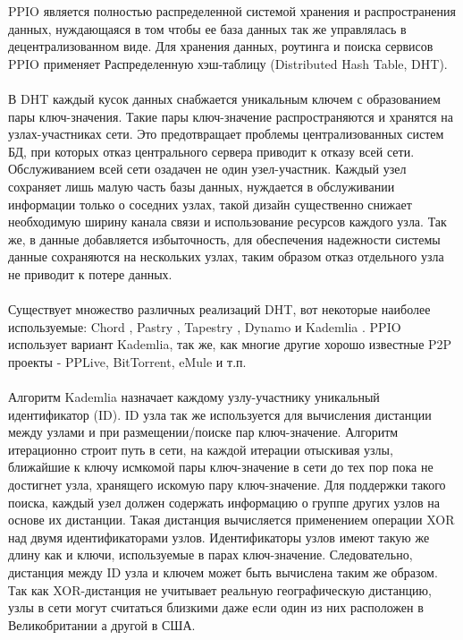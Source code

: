 \documentclass[10pt,a4paper]{article}
\begin{document}
PPIO является полностью распределенной системой хранения и распространения данных, нуждающаяся в том чтобы ее база данных так же управлялась в децентрализованном виде. Для хранения данных, роутинга и поиска сервисов PPIO применяет Распределенную хэш-таблицу (Distributed Hash Table, DHT).\\
\vspace{-0.5em}
\\В DHT каждый кусок данных снабжается уникальным ключем с образованием пары ключ-значения. Такие пары ключ-значение распространяются и хранятся на узлах-участниках сети. Это предотвращает проблемы централизованных систем БД, при которых отказ центрального сервера приводит к отказу всей сети. Обслуживанием всей сети озадачен не один узел-участник. Каждый узел сохраняет лишь малую часть базы данных, нуждается в обслуживании информации только о соседних узлах, такой дизайн существенно снижает необходимую ширину канала связи и использование ресурсов каждого узла. Так же, в данные добавляется избыточность, для обеспечения надежности системы данные сохраняются на нескольких узлах, таким образом отказ отдельного узла не приводит к потере данных.
\vspace{-0.5em}
\\ \\ Существует множество различных реализаций DHT, вот некоторые наиболее используемые: Chord \cite{article14}, Pastry \cite{article15}, Tapestry \cite{article18}, Dynamo \cite{article19} и Kademlia \cite{article16}. PPIO использует вариант Kademlia, так же, как многие другие хорошо известные P2P проекты - PPLive, BitTorrent, eMule и т.п.
 \vspace{-0.5em}
\\ \\Алгоритм Kademlia назначает каждому узлу-участнику уникальный идентификатор (ID). ID узла так же используется для вычисления дистанции между узлами и при размещении/поиске пар ключ-значение. Алгоритм итерационно строит путь в сети, на каждой итерации отыскивая узлы, ближайшие к ключу исмкомой пары ключ-значение в сети до тех пор пока не достигнет узла, хранящего искомую пару ключ-значение. Для поддержки такого поиска, каждый узел должен содержать информацию о группе других узлов на основе их дистанции. Такая дистанция вычисляется применением операции XOR над двумя идентификаторами узлов. Идентификаторы узлов имеют такую же длину как и ключи, используемые в парах ключ-значение. Следовательно, дистанция между ID узла и ключем может быть вычислена таким же образом. Так как XOR-дистанция не учитывает реальную географическую дистанцию, узлы в сети могут считаться близкими даже если один из них расположен в Великобритании а другой в США.
\end{document}
